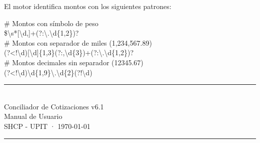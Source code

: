 \documentclass[12pt, a4paper, oneside]{report}
\begin{document}
El motor identifica montos con los siguientes patrones:

\begin{rutabox}
\# Montos con símbolo de peso\\
\$\textbackslash{}s*[\textbackslash{}d,]+(?:\textbackslash{}.\textbackslash{}d\{1,2\})?\\[4pt]
\# Montos con separador de miles (1,234,567.89)\\
(?<!\textbackslash{}d)[\textbackslash{}d]\{1,3\}(?:,\textbackslash{}d\{3\})+(?:\textbackslash{}.\textbackslash{}d\{1,2\})?\\[4pt]
\# Montos decimales sin separador (12345.67)\\
(?<!\textbackslash{}d)\textbackslash{}d\{1,9\}\textbackslash{}.\textbackslash{}d\{2\}(?!\textbackslash{}d)
\end{rutabox}

\clearpage
\thispagestyle{empty}
\pagecolor{white}
\vspace*{\fill}
\begin{center}
  {\color{vino}\rule{0.6\linewidth}{1pt}}\\[12pt]
  {\color{vino}\large Conciliador de Cotizaciones v6.1}\\[6pt]
  {\color{vino}\small Manual de Usuario}\\[6pt]
  {\color{vino}\small SHCP - UPIT · \today}\\[12pt]
  {\color{vino}\rule{0.6\linewidth}{1pt}}
\end{center}
\vspace*{\fill}
\end{document}
